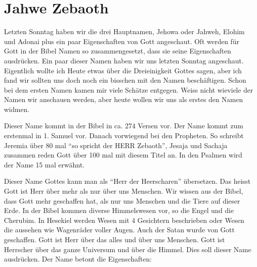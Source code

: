 \section{Jahwe Zebaoth}
\begin{otsblock}
        Letzten Sonntag haben wir die drei Hauptnamen, Jehowa oder Jahweh, Elohim und Adonai plus ein paar Eigenschaften von Gott angeschaut. Oft werden für Gott in der Bibel Namen so zusammengesetzt, dass sie seine Eigenschaften ausdrücken. Ein paar dieser Namen haben wir uns letzten Sonntag angeschaut. Eigentlich wollte ich Heute etwas über die Dreieinigkeit Gottes sagen, aber ich fand wir sollten uns doch noch ein bisschen mit den Namen beschäftigen. Schon bei dem ersten Namen kamen mir viele Schätze entgegen. Weiss nicht wieviele der Namen wir anschauen werden, aber heute wollen wir uns als erstes den Namen   widmen.

        Dieser Name kommt in der Bibel in ca. 274 Versen vor. Der Name kommt zum erstenmal in 1. Samuel vor. Danach vorwiegend bei den Propheten. So schreibt Jeremia über 80 mal \enquote{so spricht der HERR Zebaoth}, Jesaja und Sachaja zusammen reden Gott über 100 mal mit diesem Titel an. In den Psalmen wird der Name 15 mal erwähnt. 

        Dieser Name Gottes kann man als \enquote{Herr der Heerscharen} übersetzen. Das heisst Gott ist Herr über mehr als nur über uns Menschen. Wir wissen aus der Bibel, dass Gott mehr geschaffen hat, als nur uns Menschen und die Tiere auf dieser Erde. In der Bibel kommen diverse Himmelswesen vor, so \zB{} die Engel und die Cherubim. In Hesekiel werden Wesen mit 4 Gesichtern beschrieben oder Wesen die aussehen wie Wagenräder voller Augen. Auch der Satan wurde von Gott geschaffen. Gott ist Herr über das alles und über uns Menschen. Gott ist Herrscher über das ganze Universum und über die Himmel. Dies soll dieser Name ausdrücken. Der Name betont die Eigenschaften: 
    \end{otsblock}
